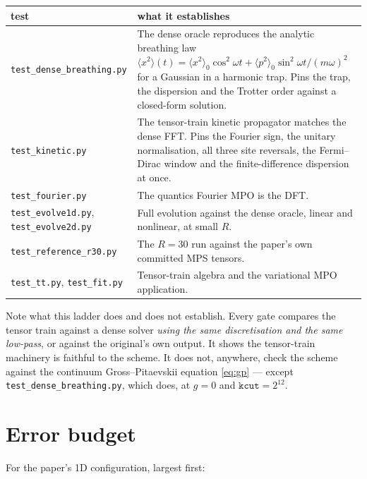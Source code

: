\documentclass[11pt,a4paper]{article}
\newcommand{\code}[1]{\texttt{#1}}
\begin{document}
\begin{center}
\begin{tabularx}{\textwidth}{@{}lL@{}}
\toprule
test & what it establishes \\
\midrule
\code{test\_dense\_breathing.py} &
  The dense oracle reproduces the analytic breathing law
  $\langle x^2\rangle(t) = \langle x^2\rangle_0\cos^2\omega t
   + \langle p^2\rangle_0 \sin^2\!\omega t/(m\omega)^2$
  for a Gaussian in a harmonic trap. Pins the trap, the dispersion and the Trotter
  order against a closed-form solution. \\
\addlinespace
\code{test\_kinetic.py} &
  The tensor-train kinetic propagator matches the dense FFT. Pins the Fourier sign,
  the unitary normalisation, all three site reversals, the Fermi--Dirac window and the
  finite-difference dispersion at once. \\
\addlinespace
\code{test\_fourier.py} & The quantics Fourier MPO is the DFT. \\
\addlinespace
\code{test\_evolve1d.py}, \code{test\_evolve2d.py} &
  Full evolution against the dense oracle, linear and nonlinear, at small $R$. \\
\addlinespace
\code{test\_reference\_r30.py} &
  The $R = 30$ run against the paper's own committed MPS tensors. \\
\addlinespace
\code{test\_tt.py}, \code{test\_fit.py} &
  Tensor-train algebra and the variational MPO application. \\
\bottomrule
\end{tabularx}
\end{center}

Note what this ladder does and does not establish. Every gate compares the tensor
train against a dense solver \emph{using the same discretisation and the same
low-pass}, or against the original's own output. It shows the tensor-train machinery
is faithful to the scheme. It does not, anywhere, check the scheme against the
continuum Gross--Pitaevskii equation \eqref{eq:gp} --- except
\code{test\_dense\_breathing.py}, which does, at $g = 0$ and $\code{kcut} = 2^{12}$.

\section{Error budget}

For the paper's 1D configuration, largest first:
\end{document}
